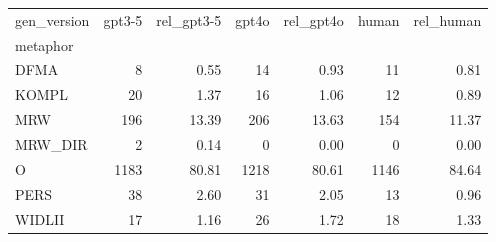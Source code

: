 \begin{tabular}{lrrrrrr}
\toprule
gen_version & gpt3-5 & rel_gpt3-5 & gpt4o & rel_gpt4o & human & rel_human \\
metaphor &  &  &  &  &  &  \\
\midrule
DFMA & 8 & 0.55 & 14 & 0.93 & 11 & 0.81 \\
KOMPL & 20 & 1.37 & 16 & 1.06 & 12 & 0.89 \\
MRW & 196 & 13.39 & 206 & 13.63 & 154 & 11.37 \\
MRW\_DIR & 2 & 0.14 & 0 & 0.00 & 0 & 0.00 \\
O & 1183 & 80.81 & 1218 & 80.61 & 1146 & 84.64 \\
PERS & 38 & 2.60 & 31 & 2.05 & 13 & 0.96 \\
WIDLII & 17 & 1.16 & 26 & 1.72 & 18 & 1.33 \\
\bottomrule
\end{tabular}
